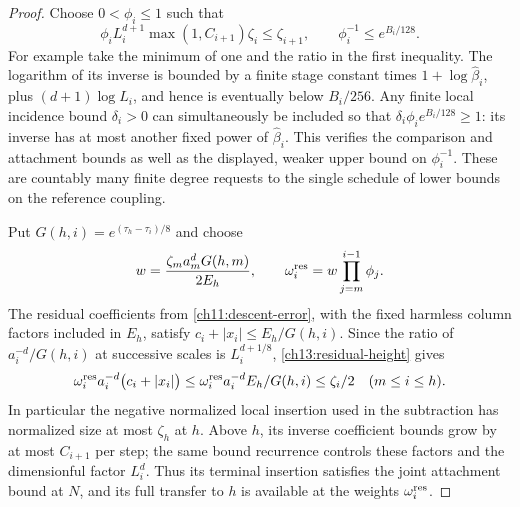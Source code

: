 \begin{proof}
Choose $0<\phi_i\le1$ such that
\begin{equation}
 \phi_i L_i^{d+1}\max(1,C_{i+1})\zeta_i\le\zeta_{i+1},
 \qquad \phi_i^{-1}\le e^{B_i/128}.
 \label{ch13:residual-height}
\end{equation}
For example take the minimum of one and the ratio in the first
inequality. The logarithm of its inverse is bounded by a finite
stage constant times $1+\log\widehat\beta_i$, plus
$(d+1)\log L_i$, and hence is eventually below $B_i/256$.
Any finite local incidence bound $\delta_i>0$ can simultaneously
be included so that $\delta_i\phi_i e^{B_i/128}\ge1$:
its inverse has at most another fixed power of
$\widehat\beta_i$. This verifies the comparison and attachment bounds as well as the displayed, weaker upper bound on
$\phi_i^{-1}$. These are countably many finite degree requests to
the single schedule of lower bounds on the reference coupling.

Put $G(h,i)=e^{(\tau_h-\tau_i)/8}$ and choose
\[
 w=\frac{\zeta_m a_m^dG(h,m)}{2E_h},\qquad
 \omega_i^{\rm res}=w\prod_{j=m}^{i-1}\phi_j.
\]
The residual coefficients from \eqref{ch11:descent-error}, with the
fixed harmless column factors included in $E_h$, satisfy
$c_i+|x_i|\le E_h/G(h,i)$. Since the ratio of
$a_i^{-d}/G(h,i)$ at successive scales is $L_i^{d+1/8}$,
\eqref{ch13:residual-height} gives
\begin{equation}
 \omega_i^{\rm res} a_i^{-d}\bigl(c_i+|x_i|\bigr)
       \le \omega_i^{\rm res} a_i^{-d}E_h/G(h,i)\le\zeta_i/2
                  \quad(m\le i\le h).
 \label{ch13:residual-height-bound}
\end{equation}
In particular the negative normalized local insertion used in the subtraction has
normalized size at most $\zeta_h$ at $h$. Above $h$, its inverse
coefficient bounds grow by at most $C_{i+1}$ per step; the same bound
recurrence controls these factors and the dimensionful factor $L_i^d$.
Thus its terminal insertion satisfies the joint attachment bound at $N$,
and its full transfer to $h$ is available at the weights $\omega_i^{\rm res}$.


\end{proof}

